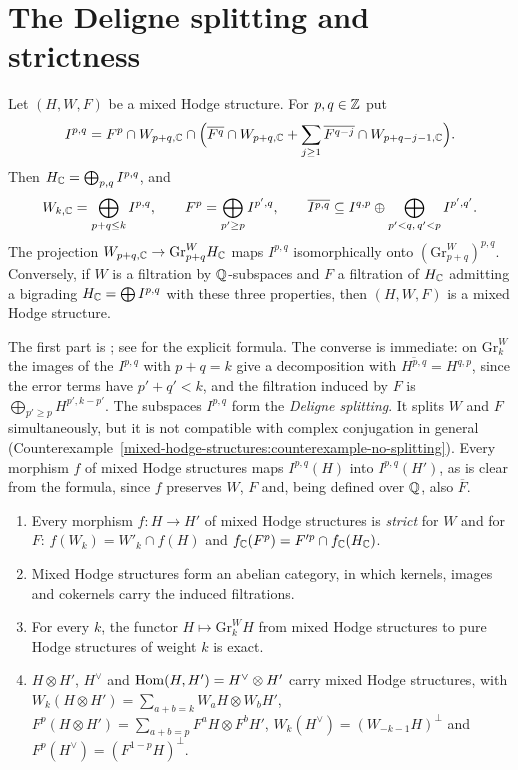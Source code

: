 \section{The Deligne splitting and strictness}\label{mixed-hodge-structures:section-strictness}

\begin{theorem}[Deligne]\label{mixed-hodge-structures:theorem-splitting}
Let $(H, W, F)$ be a mixed Hodge structure. For $p, q \in \mathbb{Z}$ put
\[
I^{p,q} = F^p \cap W_{p+q,\mathbb{C}} \cap \Big(\overline{F^q} \cap W_{p+q,\mathbb{C}} + \sum_{j \geq 1}\overline{F^{q-j}} \cap W_{p+q-j-1,\mathbb{C}}\Big).
\]
Then $H_{\mathbb{C}} = \bigoplus_{p,q}I^{p,q}$, and
\[
W_{k,\mathbb{C}} = \bigoplus_{p+q \leq k}I^{p,q}, \qquad F^p = \bigoplus_{p' \geq p}I^{p',q}, \qquad \overline{I^{p,q}} \subseteq I^{q,p} \oplus \bigoplus_{p' < q,\,q' < p}I^{p',q'}.
\]
The projection $W_{p+q,\mathbb{C}} \to \mathrm{Gr}^W_{p+q}H_{\mathbb{C}}$ maps $I^{p,q}$ isomorphically onto $(\mathrm{Gr}^W_{p+q})^{p,q}$. Conversely, if $W$ is a filtration by $\mathbb{Q}$-subspaces and $F$ a filtration of $H_{\mathbb{C}}$
admitting a bigrading $H_{\mathbb{C}} = \bigoplus I^{p,q}$ with these three properties, then $(H, W, F)$ is a mixed Hodge structure.
\end{theorem}

The first part is \cite{deligne-hodge-2}; see \cite[Chapter 3]{peters-steenbrink} for the explicit formula. The converse is immediate: on $\mathrm{Gr}^W_k$ the images of the $I^{p,q}$ with $p + q = k$
give a decomposition with $\overline{H^{p,q}} = H^{q,p}$, since the error terms have $p' + q' < k$, and the filtration induced by $F$ is $\bigoplus_{p' \geq p}H^{p',k-p'}$. The subspaces $I^{p,q}$ form
the \emph{Deligne splitting}. It splits $W$ and $F$ simultaneously, but it is not compatible with complex conjugation in general (Counterexample~\ref{mixed-hodge-structures:counterexample-no-splitting}).
Every morphism $f$ of mixed Hodge structures maps $I^{p,q}(H)$ into $I^{p,q}(H')$, as is clear from the formula, since $f$ preserves $W$, $F$ and, being defined over $\mathbb{Q}$, also $\overline F$.

\begin{theorem}[Deligne]\label{mixed-hodge-structures:theorem-abelian}
\begin{enumerate}
\item Every morphism $f \colon H \to H'$ of mixed Hodge structures is \emph{strict} for $W$ and for $F$: $f(W_k) = W'_k \cap f(H)$ and $f_{\mathbb{C}}(F^p) = F'^p \cap f_{\mathbb{C}}(H_{\mathbb{C}})$.
\item Mixed Hodge structures form an abelian category, in which kernels, images and cokernels carry the induced filtrations.
\item For every $k$, the functor $H \mapsto \mathrm{Gr}^W_kH$ from mixed Hodge structures to pure Hodge structures of weight $k$ is exact.
\item $H \otimes H'$, $H^\vee$ and $\operatorname{Hom}(H, H') = H^\vee \otimes H'$ carry mixed Hodge structures, with
$W_k(H \otimes H') = \sum_{a+b=k}W_aH \otimes W_bH'$, $F^p(H \otimes H') = \sum_{a+b=p}F^aH \otimes F^bH'$, $W_k(H^\vee) = (W_{-k-1}H)^\perp$ and $F^p(H^\vee) = (F^{1-p}H)^\perp$.
\end{enumerate}
\end{theorem}


